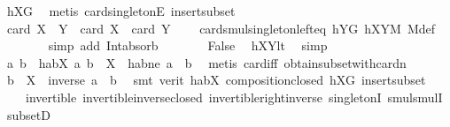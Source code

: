 \begin{isabellebody}
\ hXG\ \isamarkupfalse%
\ {\isacharparenleft}{\kern0pt}metis\ card{\isacharunderscore}{\kern0pt}{}{\isacharunderscore}{\kern0pt}singletonE\ insert{\isacharunderscore}{\kern0pt}subset{\isacharparenright}{\kern0pt}\isanewline
\ \ \ \ \isamarkupfalse%
\ \isamarkupfalse%
\ {\isachardoublequoteopen}card\ {\isacharparenleft}{\kern0pt}X\ {\isasymcdots}\ Y{\isacharparenright}{\kern0pt}\ {\isacharequal}{\kern0pt}\ card\ X\ {\isacharplus}{\kern0pt}\ card\ Y\ {\isacharminus}{\kern0pt}\ {}{\isachardoublequoteclose}\ \isamarkupfalse%
\ card{\isacharunderscore}{\kern0pt}smul{\isacharunderscore}{\kern0pt}singleton{\isacharunderscore}{\kern0pt}left{\isacharunderscore}{\kern0pt}eq\ hYG\ hXYM\ M{\isacharunderscore}{\kern0pt}def\isanewline
\ \ \ \ \ \ \isamarkupfalse%
\ {\isacharparenleft}{\kern0pt}simp\ add{\isacharcolon}{\kern0pt}\ Int{\isacharunderscore}{\kern0pt}absorb{}{\isacharparenright}{\kern0pt}\isanewline
\ \ \ \ \isamarkupfalse%
\ \isamarkupfalse%
\ False\ \isamarkupfalse%
\ hXYlt\ \isamarkupfalse%
\ simp\isanewline
\ \ \isamarkupfalse%
\isanewline
\ \ \isamarkupfalse%
\ \isamarkupfalse%
\ a\ b\ \ habX{\isacharcolon}{\kern0pt}\ {\isachardoublequoteopen}{\isacharbraceleft}{\kern0pt}a{\isacharcomma}{\kern0pt}\ b{\isacharbraceright}{\kern0pt}\ {\isasymsubseteq}\ X{\isachardoublequoteclose}\ \ habne{\isacharcolon}{\kern0pt}\ {\isachardoublequoteopen}a\ {\isasymnoteq}\ b{\isachardoublequoteclose}\ \isamarkupfalse%
\ {\isacharparenleft}{\kern0pt}metis\ card{\isacharunderscore}{\kern0pt}{}{\isacharunderscore}{\kern0pt}iff\ obtain{\isacharunderscore}{\kern0pt}subset{\isacharunderscore}{\kern0pt}with{\isacharunderscore}{\kern0pt}card{\isacharunderscore}{\kern0pt}n{\isacharparenright}{\kern0pt}\isanewline
\ \ \isamarkupfalse%
\ \isamarkupfalse%
\ {\isachardoublequoteopen}b\ {\isasymin}\ X\ {\isasymcdots}\ {\isacharbraceleft}{\kern0pt}inverse\ a\ {\isasymcdot}\ b{\isacharbraceright}{\kern0pt}{\isachardoublequoteclose}\ \isamarkupfalse%
\ {\isacharparenleft}{\kern0pt}smt\ {\isacharparenleft}{\kern0pt}verit{\isacharparenright}{\kern0pt}\ habX\ composition{\isacharunderscore}{\kern0pt}closed\ hXG\ insert{\isacharunderscore}{\kern0pt}subset\ \isanewline
\ \ \ \ invertible\ invertible{\isacharunderscore}{\kern0pt}inverse{\isacharunderscore}{\kern0pt}closed\ invertible{\isacharunderscore}{\kern0pt}right{\isacharunderscore}{\kern0pt}inverse{}\ singletonI\ smul{\isachardot}{\kern0pt}smulI\ subsetD{\isacharparenright}{\kern0pt}\isanewline

\end{isabellebody}
